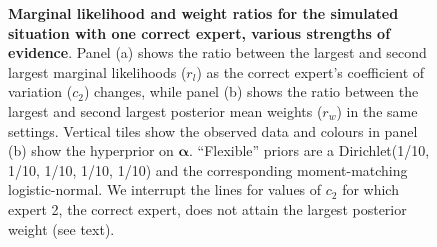 \documentclass[a4paper, notitlepage, 10pt]{article}
\begin{document}
\begin{figure}[!ht]
\begin{center}
\end{center}
\caption{\textbf{Marginal likelihood and weight ratios for the simulated situation with one correct expert, various strengths of evidence}.
Panel (a) shows the ratio between the largest and second largest marginal likelihoods ($r_l$) as the correct expert's coefficient of variation ($c_2$) changes, while panel (b) shows the ratio between the largest and second largest posterior mean weights ($r_w$) in the same settings.
Vertical tiles show the observed data and colours in panel (b) show the hyperprior on $\boldsymbol\alpha$.
``Flexible'' priors are a Dirichlet(1/10, 1/10, 1/10, 1/10, 1/10) and the corresponding moment-matching logistic-normal.
We interrupt the lines for values of $c_2$ for which expert 2, the correct expert, does not attain the largest posterior weight (see text). 
}
\label{fig:one_correct_results}
\end{figure}
\end{document}
